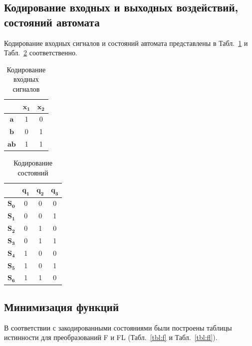 \documentclass[a4paper, final]{article}
\begin{document}
\subsection{Кодирование входных и выходных воздействий, состояний автомата}
Кодирование входных сигналов и состояний автомата представлены в Табл.~\ref{tbl:code_input} и Табл.~\ref{tbl:code_states} соответственно.

\begin{table}[h!]
  \centering
  \caption{Кодирование входных сигналов}
  \label{tbl:code_input}
  \footnotesize
  \begin{tabular}{|c|c|c|}
  \hline
        & $\mathbf{x_1}$& $\mathbf{x_2}$ \\
  \hline
  $\mathbf{a}$ & 1 & 0 \\
  \hline
  $\mathbf{b}$ & 0 & 1 \\
  \hline
  $\mathbf{ab}$ & 1 & 1 \\
  \hline
  \end{tabular}
\end{table}

\begin{table}[h!]
  \centering
  \caption{Кодирование состояний}
  \label{tbl:code_states}
  \footnotesize
  \begin{tabular}{|c|c|c|c|}
  \hline
        & $\mathbf{q_1}$& $\mathbf{q_2}$ & $\mathbf{q_3}$  \\
  \hline
  $\mathbf{S_0}$ & 0 & 0 & 0 \\
  \hline
  $\mathbf{S_1}$ & 0 & 0 & 1 \\
  \hline
  $\mathbf{S_2}$ & 0 & 1 & 0 \\
  \hline
  $\mathbf{S_3}$ & 0 & 1 & 1 \\
  \hline
  $\mathbf{S_4}$ & 1 & 0 & 0 \\
  \hline
  $\mathbf{S_5}$ & 1 & 0 & 1 \\
  \hline
  $\mathbf{S_6}$ & 1 & 1 & 0 \\
  \hline
  \end{tabular}
\end{table}


\subsection{Минимизация функций}
В соответствии с закодированными состояниями были построены таблицы истинности для преобразований F и FL (Табл.~\ref{tbl:f} и Табл.~\ref{tbl:fl}).
\end{document}
